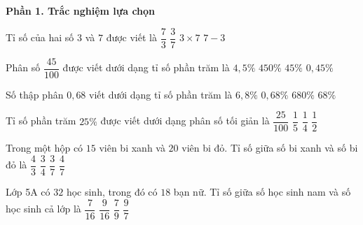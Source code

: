 \textbf{Phần 1. Trắc nghiệm lựa chọn}

\begin{ex} %
Tỉ số của hai số $3$ và $7$ được viết là
\choice
{$\dfrac{7}{3}$}
{\True $\dfrac{3}{7}$}
{$3 \times 7$}
{$7 - 3$}
\end{ex}

\begin{ex} %
Phân số $\dfrac{45}{100}$ được viết dưới dạng tỉ số phần trăm là
\choice
{$4{,}5\%$}
{$450\%$}
{\True $45\%$}
{$0{,}45\%$}
\end{ex}

\begin{ex} %
Số thập phân $0{,}68$ viết dưới dạng tỉ số phần trăm là
\choice
{$6{,}8\%$}
{$0{,}68\%$}
{$680\%$}
{\True $68\%$}
\end{ex}

\begin{ex} %
Tỉ số phần trăm $25\%$ được viết dưới dạng phân số tối giản là
\choice
{$\dfrac{25}{100}$}
{$\dfrac{1}{5}$}
{\True $\dfrac{1}{4}$}
{$\dfrac{1}{2}$}
\end{ex}

\begin{ex} %
Trong một hộp có $15$ viên bi xanh và $20$ viên bi đỏ. Tỉ số giữa số bi xanh và số bi đỏ là
\choice
{$\dfrac{4}{3}$}
{\True $\dfrac{3}{4}$}
{$\dfrac{3}{7}$}
{$\dfrac{4}{7}$}
\end{ex}

\begin{ex} %
Lớp 5A có $32$ học sinh, trong đó có $18$ bạn nữ. Tỉ số giữa số học sinh nam và số học sinh cả lớp là
\choice
{\True $\dfrac{7}{16}$}
{$\dfrac{9}{16}$}
{$\dfrac{7}{9}$}
{$\dfrac{9}{7}$}
\end{ex}


